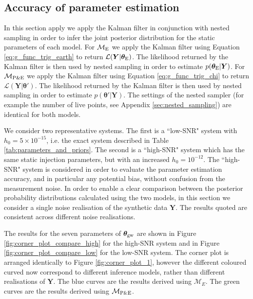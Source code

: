 \documentclass[fleqn,usenatbib,useAMS]{mnras}
\begin{document}
\subsection{Accuracy of parameter estimation}\label{sec:psr_v_earth_pe}

In this section apply we apply the Kalman filter in conjunction with nested sampling in order to infer the joint posterior distribution for the static parameters of each model. For $\mathcal{M}_{\rm E}$ we apply the Kalman filter using Equation \eqref{eq:g_func_trig_earth} to return $\mathcal{L}(\boldsymbol{Y}| \boldsymbol{\theta}_{\rm E})$. The likelihood returned by the Kalman filter is then used by nested sampling in order to estimate $p(\boldsymbol{\theta}_{\rm E} | \boldsymbol{Y})$. For $\mathcal{M}_{\rm P \& E}$ we apply the Kalman filter using Equation \eqref{eq:g_func_trig_chi} to return $\mathcal{L}(\boldsymbol{Y}| \boldsymbol{\theta}')$. The likelihood returned by the Kalman filter is then used by nested sampling in order to estimate $p(\boldsymbol{\theta'} | \boldsymbol{Y})$. The settings of the nested sampler (for example the number of live points, see Appendix \ref{sec:nested_sampling}) are identical for both models. \newline 

We consider two representative systems. The first is a ``low-SNR" system with $h_0 = 5 \times 10^{-15}$, i.e. the exact system described in Table \ref{tab:parameters_and_priors}. The second is a ``high-SNR" system which has the same static injection parameters, but with an increased $h_0 = 10^{-12}$. The ``high-SNR" system is considered in order to evaluate the parameter estimation accuracy, and in particular any potential bias, without confusion from the measurement noise. In order to enable a clear comparison between the posterior probability distributions calculated using the two models, in this section we consider a single noise realisation of the synthetic data $\boldsymbol{Y}$. The results quoted are consistent across different noise realisations. \newline 


The results for the seven parameters of  $\boldsymbol{\theta}_{\rm gw}$ are shown in Figure \ref{fig:corner_plot_compare_high} for the high-SNR system and in Figure \ref{fig:corner_plot_compare_low} for the low-SNR system. The corner plot is arranged identically to Figure \ref{fig:corner_plot_1}, however the different coloured curved now correspond to different inference models, rather than different realisations of $\boldsymbol{Y}$. The blue curves are the results derived using $\mathcal{M}_{E}$. The green curves are the results derived using $\mathcal{M}_{\rm P \& E}$. \newline 
		
\end{document}

